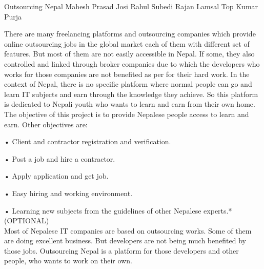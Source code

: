  \begin{conf-abstract}[]
 {Outsourcing Nepal}
 { Mahesh Prasad Josi
 	Rahul Subedi
 	Rajan Lamsal
 	Top Kumar Purja
 }
{}

There are many freelancing platforms and outsourcing companies which provide online outsourcing jobs in the global market each of them with different set of features. But most of them are not easily accessible in Nepal. If some, they also controlled and linked through broker companies due to which the developers who works for those companies are not benefited as per for their hard work.
In the context of Nepal, there is no specific platform where normal people can go and learn IT subjects and earn through the knowledge they achieve. So this platform is dedicated to Nepali youth who wants to learn and earn from their own home.
\\
The objective of this project is to provide Nepalese people access to learn and earn. Other objectives are:

•	Client and contractor registration and verification.
 
•	Post a job and hire a contractor.

•	Apply application and get job.

•	Easy hiring and working environment.

•	Learning new subjects from the guidelines of other Nepalese                         experts.*(OPTIONAL)
\\
   Most of Nepalese IT companies are based on outsourcing works. Some of them are doing excellent business. But developers are not being much benefited by those jobs. 
Outsourcing Nepal is a platform for those developers and other people, who wants to work on their own. 

\end{conf-abstract}